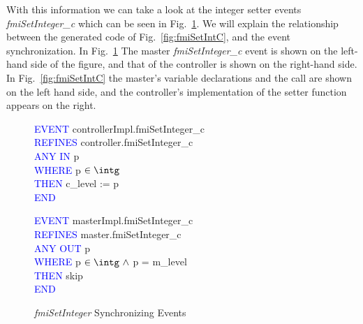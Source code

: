 \documentclass{llncs}%
\begin{document}
With this information we can take a look at the integer setter events \emph{fmiSetInteger\_c} which can be seen in Fig.~\ref{fig:fmiSetIntE}. We will explain the relationship between the generated code of Fig.~\ref{fig:fmiSetIntC}, and the event synchronization. In  Fig.~\ref{fig:fmiSetIntE} The master \emph{fmiSetInteger\_c} event is shown on the left-hand side of the figure, and that of the controller is shown on the right-hand side. In Fig.~\ref{fig:fmiSetIntC} the master's variable declarations and the call are shown on the left hand side, and the controller's implementation of the setter function appears on the right.    
%
%
\begin{figure}
\centering
\begin{minipage}{0.48\textwidth}
\textcolor{blue}{EVENT} controllerImpl.fmiSetInteger\_c \\
\textcolor{blue}{REFINES} controller.fmiSetInteger\_c\\
\textcolor{blue}{ANY IN} p\\
\textcolor{blue}{WHERE} p $\in  \intg$ \\
\textcolor{blue}{THEN} c\_level :=  p\\
\textcolor{blue}{END}
\end{minipage}
\begin{minipage}{0.48\textwidth}
\textcolor{blue}{EVENT} masterImpl.fmiSetInteger\_c \\
\textcolor{blue}{REFINES} master.fmiSetInteger\_c\\
\textcolor{blue}{ANY OUT} p\\
\textcolor{blue}{WHERE} p $\in  \intg~ \land$ p = m\_level\\
\textcolor{blue}{THEN} skip\\
\textcolor{blue}{END}
\end{minipage}
\caption{\emph{fmiSetInteger} Synchronizing Events}
\label{fig:fmiSetIntE}
\end{figure}
%
%
\end{document}
